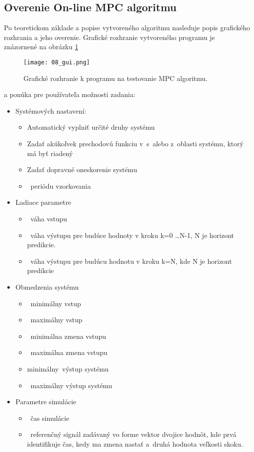 \subsection{Overenie On-line MPC algoritmu} \label{mpcprogram}
Po teoretickom základe a popise vytvoreného algoritmu nasleduje popis grafického rozhrania a jeho overenie. Grafické rozhranie vytvoreného programu je znázornené na obrázku \ref{08_gui} 

\begin{figure}[!htbp]
\centering
\texttt{[image: 08\_gui.png]}
\caption{Grafické rozhranie k programu na testovanie MPC algoritmu.}
\label{08_gui}
\end{figure}

a ponúka pre používateľa možnosti zadania:

\begin{itemize}
\item
  Systémových nastavení:

  \begin{itemize}
  \item
    Automatický vyplniť určité druhy systému
  \item
    Zadať akúkoľvek prechodovú funkciu v~s~alebo z~oblasti systému,
    ktorý má byť riadený
  \item
    Zadať dopravné oneskorenie systému
  \item
    ~periódu vzorkovania
  \end{itemize}
\item
  Ladiace parametre

  \begin{itemize}
  \item
    ~váha vstupu
  \item
    ~váha výstupu pre budúce hodnoty v kroku k=0 \dots N-1, N je horizont predikcie.
  \item
    ~váha výstupu pre budúcu hodnotu v kroku k=N, kde N je horizont predikcie
  \end{itemize}
\item
  Obmedzenia systému

  \begin{itemize}
  \item
    ~minimálny vstup
  \item
    ~maximálny vstup
  \item
    ~minimálna zmena vstupu
  \item
    ~maximálna zmena vstupu
  \item
    minimálny~výstup systému
  \item
    ~maximálny výstup systému
  \end{itemize}
\item
  Parametre simulácie

  \begin{itemize}
  \item
    ~čas simulácie
  \item
    ~referenčný signál zadávaný vo forme vektor dvojice hodnôt, kde prvá
    identifikuje čas, kedy ma zmena nastať a~druhá hodnota veľkosti
    skoku.
  \end{itemize}
\end{itemize}

